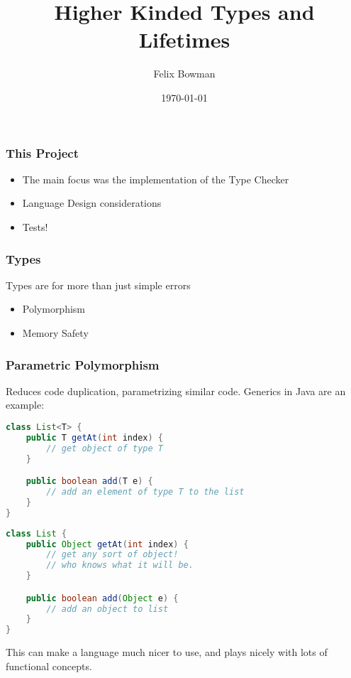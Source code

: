 \documentclass[xcolor=dvipsnames, aspectratio=169]{beamer}
\begin{document}
\title{Higher Kinded Types and Lifetimes}
\author{Felix Bowman}

\date{\today}

\frame{\titlepage}

\begin{frame}
    \frametitle{This Project}
    \begin{itemize}
        \item The main focus was the implementation of the Type Checker
        \item Language Design considerations
        \item Tests!
    \end{itemize}
\end{frame}

\begin{frame}
    \frametitle{Types}
    Types are for more than just simple errors
    \begin{itemize}
        \item Polymorphism
        \item Memory Safety
    \end{itemize}
\end{frame}

\begin{frame}[fragile]
    \frametitle{Parametric Polymorphism}
    Reduces code duplication, parametrizing similar code. Generics in Java are
    an example:
    \begin{minipage}{0.45\textwidth}
        \begin{lstlisting}[language=Java]
class List<T> {
    public T getAt(int index) {
        // get object of type T
    }

    public boolean add(T e) {
        // add an element of type T to the list
    }
}
        \end{lstlisting}
    \end{minipage}%
    \begin{minipage}{0.45\textwidth}
        \begin{lstlisting}[language=Java]
class List {
    public Object getAt(int index) {
        // get any sort of object!
        // who knows what it will be.
    }

    public boolean add(Object e) {
        // add an object to list
    }
}
        \end{lstlisting}
    \end{minipage}

    This can make a language much nicer to use, and plays nicely with lots of
    functional concepts.
\end{frame}
\end{document}
